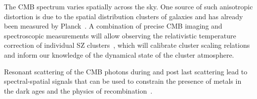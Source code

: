 
The CMB spectrum varies spatially across the sky. One source of such anisotropic distortion is due to 
the spatial distribution clusters of galaxies and has already been measured by Planck~\cite{Planck2013SZ}. 
A combination of precise CMB imaging 
and spectroscopic measurements will allow observing the relativistic temperature correction of individual SZ 
clusters~\cite{Sazonov1998,Itoh98,Challinor98}, which will calibrate cluster scaling relations and inform our 
knowledge of the dynamical state of the cluster atmosphere. 

Resonant scattering of the CMB photons during and post last scattering lead to spectral-spatial signals
that can be used to constrain the presence of metals in the dark ages and the physics of 
recombination~\cite{Jose2005, Carlos2007Pol, Lewis2013,Kaustuv2004, Schleicher2008}.  




